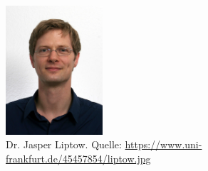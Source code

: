 \documentclass[]{scrartcl}
\begin{document}
\begin{figure}[]
	\centering
	\includegraphics[width=0.32\textwidth]{images/liptow.jpg}
	\caption{Dr. Jasper Liptow. Quelle: \url{https://www.uni-frankfurt.de/45457854/liptow.jpg}}
	\label{fig:liptow}
\end{figure}

\end{document}
